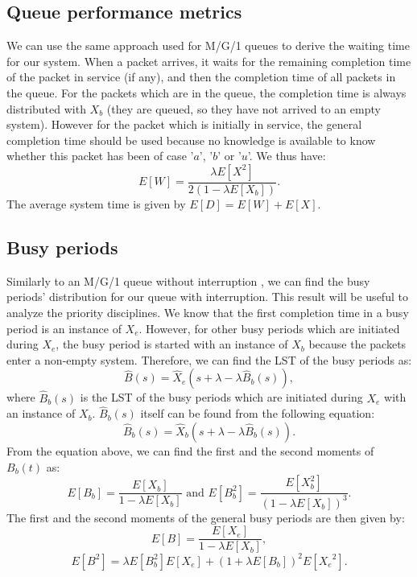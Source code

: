 \documentclass[11pt,journal,oneside,onecolumn,draftclsnofoot]{IEEEtran}
\begin{document}
\subsection{Queue performance metrics}
We can use the same approach used for M/G/1 queues to derive the waiting time for our system. When a packet arrives, it waits for the remaining completion time of the packet in service (if any), and then the completion time of all packets in the queue. For the packets which are in the queue, the completion time is always distributed with $X_b$ (they are queued, so they have not arrived to an empty system). However for the packet which is initially in service, the general completion time should be used because no knowledge is available to know whether this packet has been of case '$a$', '$b$' or '$u$'. We thus have:
\begin{equation}
E[W] = \frac{\lambda E[X^{2}]}{2(1-\lambda E[X_b])}.
\label{eq:waiting-by-fred}
\end{equation}
The average system time is given by 
$E[D] = E[W] + E[X]$.

\subsection{Busy periods}
\label{subsec:busy-periods}
Similarly to an M/G/1 queue without interruption \cite{takagi91}, we can find the busy periods' distribution for our queue with interruption. This result will be useful to analyze the priority disciplines. We know that the first completion time in a busy period is an instance of $X_e$. However, for other busy periods which are initiated during $X_e$, the busy period is started with an instance of $X_b$ because the packets enter a non-empty system. Therefore, we can find the LST of the busy periods as:
\begin{equation}
\widehat{B}(s)=\widehat{X}_e(s+\lambda-\lambda \widehat{B}_b(s)),
\label{eq:busypr-B}
\end{equation}
where $\widehat{B}_b(s)$ is the LST of the busy periods which are initiated during $X_e$ with an instance of $X_b$. $\widehat{B}_b(s)$ itself can be found from the following equation:
\begin{equation}
\widehat{B}_b(s)=\widehat{X}_b(s+\lambda-\lambda \widehat{B}_b(s)).
\label{eq:busypr-Bb}
\end{equation}
From the equation above, we can find the first and the second moments of $B_b(t)$ 
as:
\begin{equation}
E[B_b]=\frac{E[X_b]}{1-\lambda E[X_b]} \mbox{ and } E[B_b^2]=\frac{E[X_b^2]}{(1-\lambda E[X_b])^3}.
\label{eq:}
\end{equation}  
The first and the second moments of the general busy periods are then given by:
\begin{equation}
E[B]=\frac{E[X_e]}{1-\lambda E[X_b]},
\label{eq:busypr-E}
\end{equation}
\begin{equation}
E[B^2]=\lambda{E[B_b^2]}{E[X_e]} + (1+\lambda E[B_b])^2 E[{X_e}^2].
\label{eq:busypr-E2}
\end{equation}
\end{document}
